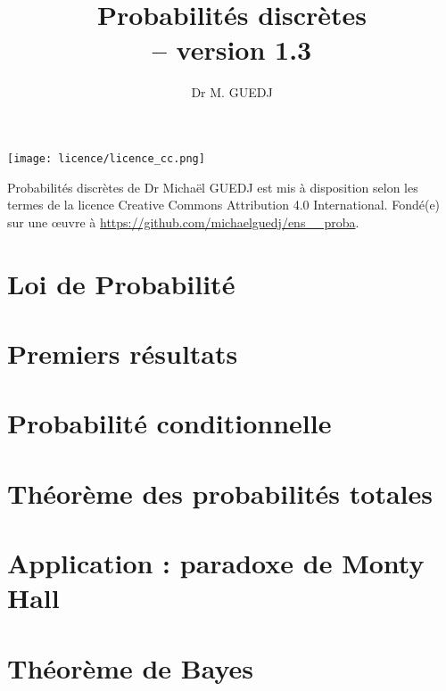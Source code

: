 \documentclass[11pt]{article} %
\title{Probabilités discrètes\\ -- version 1.3}
\date{\vspace{-5ex}}
\author{Dr M. GUEDJ}
\begin{document}
\renewcommand{\contentsname}{Table des Matières}
\maketitle

\newpage
\begin{center}
	\texttt{[image: licence/licence\_cc.png]}
	
	\begin{small}
Probabilités discrètes de Dr Michaël GUEDJ est mis à disposition selon les termes de la licence Creative Commons Attribution 4.0 International.
Fondé(e) sur une œuvre à 
		\url{https://github.com/michaelguedj/ens__proba}.
	\end{small}
\end{center}
\newpage

\tableofcontents


\section{Loi de Probabilité}


\section{Premiers résultats}


\section{Probabilité conditionnelle}


\section{Théorème des probabilités totales}


\section{Application : paradoxe de Monty Hall}


\section{Théorème de Bayes}

\end{document}
